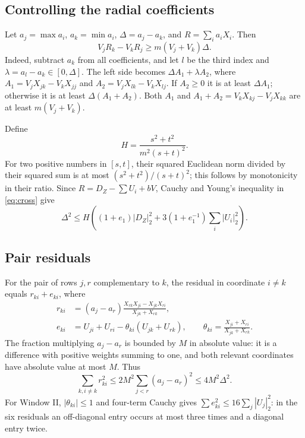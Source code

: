 \documentclass[11pt,a4paper]{article}
\theoremstyle{remark}\newtheorem{remark}[theorem]{Remark}
\begin{document}
\subsection{Controlling the radial coefficients}
Let $a_j=\max a_i$, $a_k=\min a_i$, $\Delta=a_j-a_k$, and
$R=\sum_i a_iX_i$. Then
\begin{equation}\label{eq:cross}
V_jR_k-V_kR_j\ge m(V_j+V_k)\Delta.
\end{equation}
Indeed, subtract $a_k$ from all coefficients, and let $l$ be the third
index and $\lambda=a_l-a_k\in[0,\Delta]$. The left side becomes
$\Delta A_1+\lambda A_2$, where
$A_1=V_jX_{jk}-V_kX_{jj}$ and $A_2=V_jX_{lk}-V_kX_{lj}$.
If $A_2\ge0$ it is at least $\Delta A_1$; otherwise it is at least
$\Delta(A_1+A_2)$. Both $A_1$ and
$A_1+A_2=V_kX_{kj}-V_jX_{kk}$ are at least $m(V_j+V_k)$.

Define
\begin{equation}\label{eq:Hshape} H=\frac{s^2+t^2}{m^2(s+t)^2}.\end{equation}
For two positive numbers in $[s,t]$, their squared Euclidean norm divided
by their squared sum is at most $(s^2+t^2)/(s+t)^2$; this follows by
monotonicity in their ratio. Since $R=D_Z-\sum U_i+bV$, Cauchy and
Young's inequality in \eqref{eq:cross} give
\begin{equation}\label{eq:delta}
\Delta^2\le H\left((1+e_1)|D_Z|_2^2+
3(1+e_1^{-1})\sum_i|U_i|_2^2\right).
\end{equation}

\subsection{Pair residuals}
For the pair of rows $j,r$ complementary to $k$, the residual in coordinate
$i\ne k$ equals $r_{ki}+e_{ki}$, where
\begin{align}
r_{ki}&=(a_j-a_r)\frac{X_{rk}X_{ji}-X_{jk}X_{ri}}{X_{jk}+X_{rk}},\nonumber\\
e_{ki}&=U_{ji}+U_{ri}-\theta_{ki}(U_{jk}+U_{rk}),\qquad
\theta_{ki}=\frac{X_{ji}+X_{ri}}{X_{jk}+X_{rk}}.\label{eq:pairres}
\end{align}
The fraction multiplying $a_j-a_r$ is bounded by $M$ in absolute value:
it is a difference with positive weights summing to one, and both relevant
coordinates have absolute value at most $M$. Thus
\begin{equation}\label{eq:rbound}
\sum_{k,i\ne k}r_{ki}^2\le2M^2\sum_{j<r}(a_j-a_r)^2\le4M^2\Delta^2.
\end{equation}
For Window II, $|\theta_{ki}|\le1$ and four-term Cauchy gives
$\sum e_{ki}^2\le16\sum_j|U_j|_2^2$: in the six residuals an off-diagonal
entry occurs at most three times and a diagonal entry twice.
\end{document}
